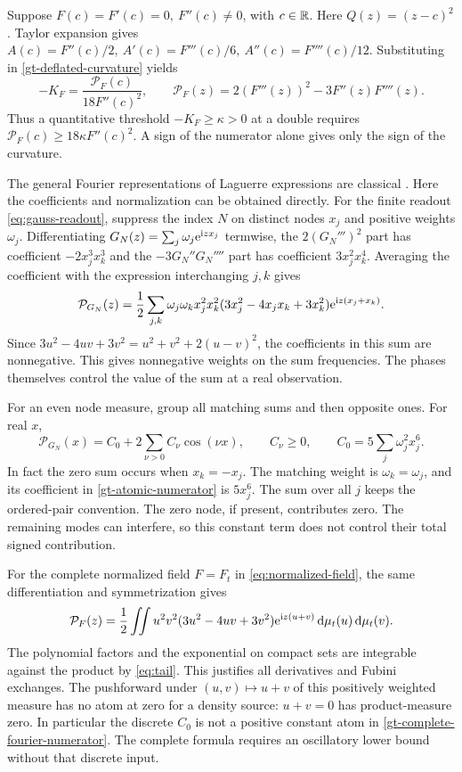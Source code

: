 Suppose \(F(c)=F'(c)=0,\ F''(c)\ne0\), with \(c\in\mathbb R\).
Here \(Q(z)=(z-c)^2\). Taylor expansion gives
\(A(c)=F''(c)/2,\ A'(c)=F'''(c)/6,\ A''(c)=F''''(c)/12\).
Substituting in \eqref{gt-deflated-curvature} yields
\begin{equation}
 -K_F=\frac{\mathcal P_F(c)}{18 F''(c)^2},\qquad
 \mathcal P_F(z)=2(F'''(z))^2-3F''(z)F''''(z).
 \label{gt-fourier-numerator}
\end{equation}
Thus a quantitative threshold \(-K_F\ge\kappa>0\) at a double
requires \(\mathcal P_F(c)\ge18\kappa F''(c)^2\).
A sign of the numerator alone gives only the sign of the curvature.

The general Fourier representations of Laguerre expressions
are classical \cite[Theorems~2.4 and~3.7]{csordas}. Here the
coefficients and normalization can be obtained directly.
For the finite readout \eqref{eq:gauss-readout}, suppress the
index \(N\) on distinct nodes \(x_j\) and positive weights \(\omega_j\).
Differentiating \(G_N(z)=\sum_j\omega_j\mathrm e^{\mathrm i z x_j}\) termwise,
the \(2(G_N''')^2\) part has coefficient \(-2x_j^3x_k^3\)
and the \(-3G_N''G_N''''\) part has coefficient \(3x_j^2x_k^4\).
Averaging the coefficient with the expression interchanging \(j,k\) gives
\begin{equation}
 \mathcal P_{G_N}(z)=\frac12\sum_{j,k}\omega_j\omega_k
 x_j^2x_k^2(3x_j^2-4x_jx_k+3x_k^2)\mathrm e^{\mathrm i z(x_j+x_k)} .
 \label{gt-atomic-numerator}
\end{equation}
Since \(3u^2-4uv+3v^2=u^2+v^2+2(u-v)^2\), the coefficients in
this sum are nonnegative. This gives nonnegative weights on the
sum frequencies. The phases themselves control the value of the sum
at a real observation.

For an even node measure, group all matching sums and then opposite
ones. For real \(x\),
\[
 \mathcal P_{G_N}(x)=C_0+2\sum_{\nu>0}C_\nu\cos(\nu x),\qquad
 C_\nu\ge0,\qquad C_0=5\sum_j\omega_j^2 x_j^6 .
\]
In fact the zero sum occurs when \(x_k=-x_j\). The matching weight
is \(\omega_k=\omega_j\), and its coefficient in
\eqref{gt-atomic-numerator} is \(5x_j^6\).
The sum over all \(j\) keeps the ordered-pair convention. The zero node,
if present, contributes zero. The remaining modes can interfere, so
this constant term does not control their total signed contribution.

For the complete normalized field \(F=F_t\) in
\eqref{eq:normalized-field}, the same differentiation and
symmetrization gives
\begin{equation}
 \mathcal P_F(z)=\frac12\iint u^2v^2(3u^2-4uv+3v^2)
                 \mathrm e^{\mathrm i z(u+v)}\,\mathrm d\mu_t(u)\,\mathrm d\mu_t(v).
 \label{gt-complete-fourier-numerator}
\end{equation}
The polynomial factors and the exponential on compact sets are
integrable against the product by \eqref{eq:tail}. This justifies
all derivatives and Fubini exchanges. The pushforward under
\((u,v)\mapsto u+v\) of this positively weighted measure has no atom
at zero for a density source: \(u+v=0\) has product-measure zero.
In particular the discrete \(C_0\) is not a positive constant atom
in \eqref{gt-complete-fourier-numerator}. The complete formula
requires an oscillatory lower bound without that discrete input.

